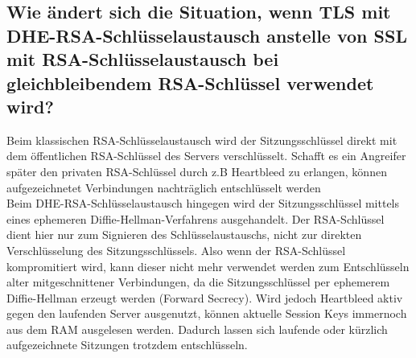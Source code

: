 \subsection{Wie ändert sich die Situation, wenn TLS mit DHE-RSA-Schlüsselaustausch anstelle von SSL mit RSA-Schlüsselaustausch bei gleichbleibendem RSA-Schlüssel verwendet wird?}
Beim klassischen RSA-Schlüsselaustausch wird der Sitzungsschlüssel direkt mit dem öffentlichen RSA-Schlüssel des Servers verschlüsselt. Schafft es ein Angreifer später den privaten RSA-Schlüssel durch z.B Heartbleed zu erlangen, können aufgezeichnetet Verbindungen nachträglich entschlüsselt werden\\
Beim DHE-RSA-Schlüsselaustausch hingegen wird der Sitzungsschlüssel mittels eines ephemeren Diffie-Hellman-Verfahrens ausgehandelt. Der RSA-Schlüssel dient hier nur zum Signieren des Schlüsselaustauschs, nicht zur direkten Verschlüsselung des Sitzungsschlüssels.
Also wenn der RSA-Schlüssel kompromitiert wird, kann dieser nicht mehr verwendet werden zum Entschlüsseln alter mitgeschnittener Verbindungen, da die Sitzungsschlüssel per ephemerem Diffie-Hellman erzeugt werden (Forward Secrecy). Wird jedoch Heartbleed aktiv gegen den laufenden Server ausgenutzt, können aktuelle Session Keys immernoch aus dem RAM ausgelesen werden. Dadurch lassen sich laufende oder kürzlich aufgezeichnete Sitzungen trotzdem entschlüsseln.

